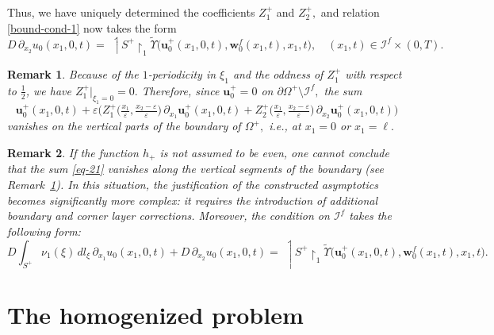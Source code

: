 \documentclass[reqno]{amsart}            %
\newtheorem{remark}{Remark}[section]
\numberwithin{equation}{section}
\begin{document}
	Thus, we have uniquely determined the coefficients $Z^+_1$ and $Z^+_2,$ and relation \eqref{bound-cond-1} now takes the form
	\begin{equation}\label{bound-cond-hom}
		D \,  \partial_{x_2}{u}_0(x_1,0,t)
		=  \ \upharpoonleft\!\! {S}^+\!\!\upharpoonright_1 \widetilde{\Upsilon}\big(\mathbf{u}^+_0(x_1,0,t), \mathbf{w}^f_0(x_1,t), x_1, t \big), \quad (x_1, t) \in \mathcal{I}^f \times (0, T).
	\end{equation}
	\begin{remark}\label{rem-4-4}
		Because of the $1$-periodicity  in $\xi_1$ and the oddness of $Z^+_1$ with respect to $\frac{1}{2}$,  we have $Z^+_1\big|_{\xi_1=0} = 0.$
		Therefore, since $\mathbf{u}^+_0=0$ on $\partial\Omega^+  \setminus \mathcal{I}^f,$ the sum 
		\begin{equation}\label{eq-21}
			\mathbf{u}^+_0(x_1,0,t) + \varepsilon \Big(Z^+_1\big(\tfrac{x_1}{\varepsilon}, 
			\tfrac{x_2- \varepsilon}{\varepsilon}\big)\, \partial_{x_1}\mathbf{u}^+_0(x_1,0,t) + Z^+_2\big(\tfrac{x_1}{\varepsilon}, 
			\tfrac{x_2- \varepsilon}{\varepsilon}\big)\, \partial_{x_2}\mathbf{u}^+_0(x_1,0,t)\Big)
		\end{equation}
		vanishes on the vertical parts of the boundary of $\Omega^+,$ i.e., at $x_1 = 0$ or $x_1=\ell.$
	\end{remark}
	\begin{remark}
		If the function $h_+$ is not assumed to be even, one cannot conclude that the sum \eqref{eq-21} vanishes along the vertical segments of the boundary (see Remark~\ref{rem-4-4}). In this situation, the justification of the constructed asymptotics becomes significantly more complex: it requires the introduction 
		of additional boundary and corner layer corrections. Moreover, the condition on $\mathcal{I}^f$ takes the following form:
		$$
		D \int_{S^+}\nu_1(\xi)\, dl_\xi\,  \partial_{x_1}{u}_0(x_1,0,t) + 
		D \,  \partial_{x_2}{u}_0(x_1,0,t)
		=  \ \upharpoonleft\!\! {S}^+\!\!\upharpoonright_1 \widetilde{\Upsilon}\big(\mathbf{u}^+_0(x_1,0,t), \mathbf{w}^f_0(x_1,t), x_1, t \big).
		$$ 
	\end{remark}
	
	
	
	\section{The homogenized  problem}\label{Sect-4} 
	
\end{document}
